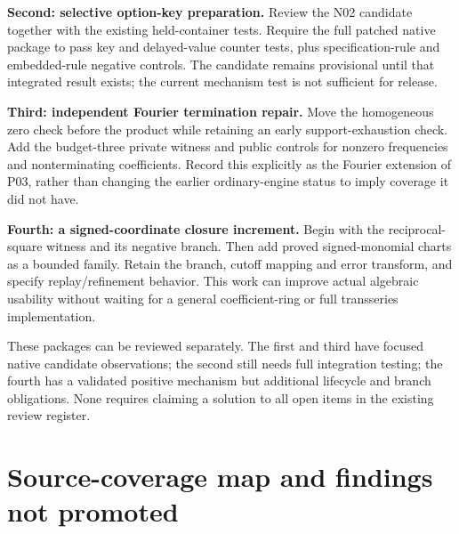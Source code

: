 \documentclass[11pt,a4paper]{article}
\begin{document}
\textbf{Second: selective option-key preparation.} Review the N02 candidate together with the existing held-container tests. Require the full patched native package to pass key and delayed-value counter tests, plus specification-rule and embedded-rule negative controls. The candidate remains provisional until that integrated result exists; the current mechanism test is not sufficient for release.

\textbf{Third: independent Fourier termination repair.} Move the homogeneous zero check before the product while retaining an early support-exhaustion check. Add the budget-three private witness and public controls for nonzero frequencies and nonterminating coefficients. Record this explicitly as the Fourier extension of P03, rather than changing the earlier ordinary-engine status to imply coverage it did not have.

\textbf{Fourth: a signed-coordinate closure increment.} Begin with the reciprocal-square witness and its negative branch. Then add proved signed-monomial charts as a bounded family. Retain the branch, cutoff mapping and error transform, and specify replay/refinement behavior. This work can improve actual algebraic usability without waiting for a general coefficient-ring or full transseries implementation.

These packages can be reviewed separately. The first and third have focused native candidate observations; the second still needs full integration testing; the fourth has a validated positive mechanism but additional lifecycle and branch obligations. None requires claiming a solution to all open items in the existing review register.

\section{Source-coverage map and findings not promoted}
\label{sec:coverage}
\end{document}
